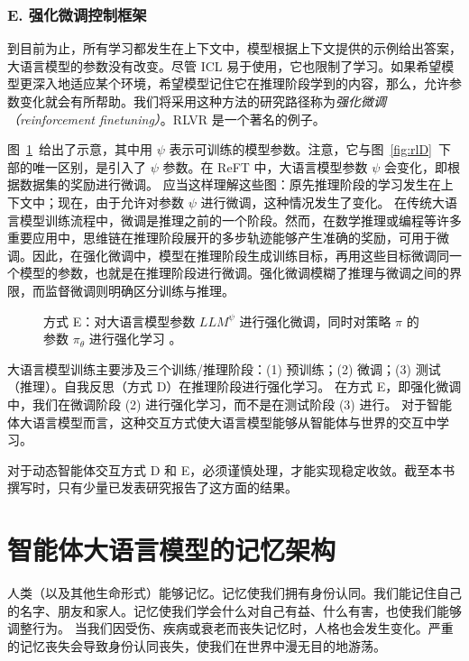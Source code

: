 \subsubsection{E. 强化微调控制框架}
到目前为止，所有学习都发生在上下文中，模型根据上下文提供的示例给出答案，大语言模型的参数没有改变。尽管 ICL 易于使用，它也限制了学习。如果希望模型更深入地适应某个环境，希望模型记住它在推理阶段学到的内容，那么，允许参数变化就会有所帮助。我们将采用这种方法的研究路径称为{\em 强化微调（reinforcement finetuning）}。RLVR 是一个著名的例子。

图~\ref{fig:rlE}~给出了示意，其中用 $\psi$ 表示可训练的模型参数。注意，它与图~\ref{fig:rlD}~下部的唯一区别，是引入了 $\psi$ 参数。在 ReFT 中，大语言模型参数 $\psi$ 会变化，即根据数据集的奖励进行微调。
应当这样理解这些图：原先推理阶段的学习发生在上下文中；现在，由于允许对参数 $\psi$ 进行微调，这种情况发生了变化。
在传统大语言模型训练流程中，微调是推理之前的一个阶段。然而，在数学推理或编程等许多重要应用中，思维链在推理阶段展开的多步轨迹能够产生准确的奖励，可用于微调。因此，在强化微调中，模型在推理阶段生成训练目标，再用这些目标微调同一个模型的参数，也就是在推理阶段进行微调。强化微调模糊了推理与微调之间的界限，而监督微调则明确区分训练与推理。



\begin{figure}
  \begin{center}
    
    \caption{方式 E：对大语言模型参数 $LLM^\psi$ 进行强化微调，同时对策略 $\pi$ 的参数 $\pi_\theta$ 进行强化学习 \citep{luong2024reft}。}\label{fig:rlE}
  \end{center}
\end{figure}

大语言模型训练主要涉及三个训练/推理阶段：(1) 预训练；(2) 微调；(3) 测试（推理）。自我反思（方式 D）在推理阶段进行强化学习。
在方式 E，即强化微调中，我们在微调阶段 (2) 进行强化学习，而不是在测试阶段 (3) 进行。
对于智能体大语言模型而言，这种交互方式使大语言模型能够从智能体与世界的交互中学习。

对于动态智能体交互方式 D 和 E，必须谨慎处理，才能实现稳定收敛。截至本书撰写时，只有少量已发表研究报告了这方面的结果。

\section{智能体大语言模型的记忆架构}\label{sec:memory}
人类（以及其他生命形式）能够记忆。记忆使我们拥有身份认同。我们能记住自己的名字、朋友和家人。记忆使我们学会什么对自己有益、什么有害，也使我们能够调整行为。
当我们因受伤、疾病或衰老而丧失记忆时，人格也会发生变化。严重的记忆丧失会导致身份认同丧失，使我们在世界中漫无目的地游荡。

